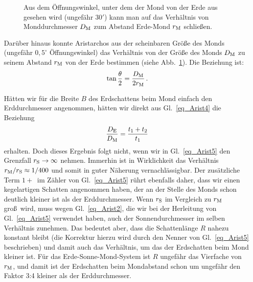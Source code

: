 \begin{SCfigure}[30][htb]
\caption{\label{fig_Arist3}%
Aus dem \"Offnungswinkel, unter dem der Mond von der Erde aus gesehen wird (ungef\"ahr $30'$) kann man auf
das Verh\"altnis von Monddurchmesser $D_{\rm M}$ zum Abstand Erde-Mond $r_{\rm M}$ schlie\ss en.}
\end{SCfigure}

Dar\"uber hinaus konnte Aristarchos
aus der scheinbaren Gr\"o\ss e des Monds (ungef\"ahr $0,5^\circ$ \"Offnungswinkel) das
Verh\"altnis von der Gr\"o\ss e des Monds $D_{\rm M}$ zu seinem Abstand $r_{\rm M}$ 
von der Erde bestimmen (siehe Abb.\ \ref{fig_Arist3}).
Die Beziehung ist:
\begin{equation}
\label{eq_Parallaxe}
                       \tan \frac{\theta}{2} = \frac{D_{\rm M}}{2 r_{\rm M}} \, .
\end{equation}  

H\"atten wir f\"ur die Breite $B$ des Erdschattens beim Mond einfach den Erddurchmesser
angenommen, h\"atten wir direkt aus Gl.\ \ref{eq_Arist4} die Beziehung
\begin{equation}
                  \frac{D_{\rm E}}{D_{\rm M}}  = \frac{t_1+t_2}{t_1}    
\end{equation}  
erhalten. Doch
dieses Ergebnis folgt nicht, wenn wir in Gl.\ \ref{eq_Arist5} den Grenzfall $r_{\rm S} \rightarrow \infty$ 
nehmen. Immerhin ist in Wirklichkeit das Verh\"altnis $r_{\rm M}/r_{\rm S}\approx 1/400$ und somit in guter
N\"aherung vernachl\"assigbar. Der zus\"atzliche Term \glqq $1+$\grqq\ im Z\"ahler von Gl.\ \ref{eq_Arist5} r\"uhrt 
ebenfalls daher, dass wir einen kegelartigen Schatten angenommen haben, der an der Stelle des Monds schon 
deutlich kleiner ist als der Erddurchmesser. Wenn $r_{\rm S}$ im Vergleich zu $r_{\rm M}$ gro\ss\ wird, muss
wegen Gl.\ \ref{eq_Arist2}, die wir bei der Herleitung von Gl.\ \ref{eq_Arist5} verwendet haben, auch der
Sonnendurchmesser im selben Verh\"altnis zunehmen. Das bedeutet aber, dass die Schattenl\"ange
$R$ nahezu konstant bleibt (die Korrektur hierzu wird durch den Nenner von Gl.\ \ref{eq_Arist5} beschrieben)
und damit auch das Verh\"altnis, um das der Erdschatten beim Mond kleiner ist. F\"ur das Erde-Sonne-Mond-System
ist $R$ ungef\"ahr das Vierfache von $r_{\rm M}$, und damit ist der Erdschatten beim Mondabstand schon
um ungef\"ahr den Faktor 3:4 kleiner als der Erddurchmesser.  


